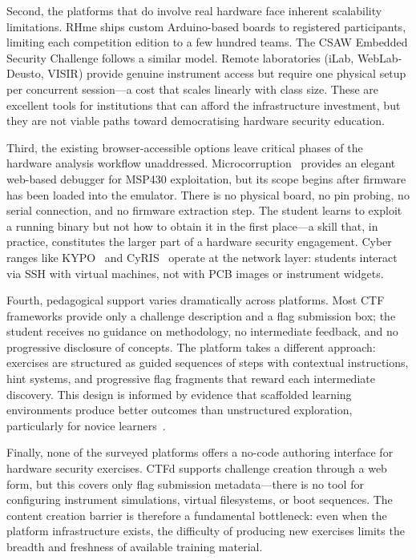 Second, the platforms that do involve real hardware face inherent scalability limitations. RHme ships custom Arduino-based boards to registered participants, limiting each competition edition to a few hundred teams. The CSAW Embedded Security Challenge follows a similar model. Remote laboratories (iLab, WebLab-Deusto, VISIR) provide genuine instrument access but require one physical setup per concurrent session---a cost that scales linearly with class size. These are excellent tools for institutions that can afford the infrastructure investment, but they are not viable paths toward democratising hardware security education.

Third, the existing browser-accessible options leave critical phases of the hardware analysis workflow unaddressed. Microcorruption~\cite{microcorruption} provides an elegant web-based debugger for MSP430 exploitation, but its scope begins after firmware has been loaded into the emulator. There is no physical board, no pin probing, no serial connection, and no firmware extraction step. The student learns to exploit a running binary but not how to obtain it in the first place---a skill that, in practice, constitutes the larger part of a hardware security engagement. Cyber ranges like KYPO~\cite{kypo2017} and CyRIS~\cite{cyris2017} operate at the network layer: students interact via SSH with virtual machines, not with PCB images or instrument widgets.

Fourth, pedagogical support varies dramatically across platforms. Most CTF frameworks provide only a challenge description and a flag submission box; the student receives no guidance on methodology, no intermediate feedback, and no progressive disclosure of concepts. The \pcbctf{} platform takes a different approach: exercises are structured as guided sequences of steps with contextual instructions, hint systems, and progressive flag fragments that reward each intermediate discovery. This design is informed by evidence that scaffolded learning environments produce better outcomes than unstructured exploration, particularly for novice learners~\cite{svabensky2020}.

Finally, none of the surveyed platforms offers a no-code authoring interface for hardware security exercises. CTFd supports challenge creation through a web form, but this covers only flag submission metadata---there is no tool for configuring instrument simulations, virtual filesystems, or boot sequences. The content creation barrier is therefore a fundamental bottleneck: even when the platform infrastructure exists, the difficulty of producing new exercises limits the breadth and freshness of available training material.

